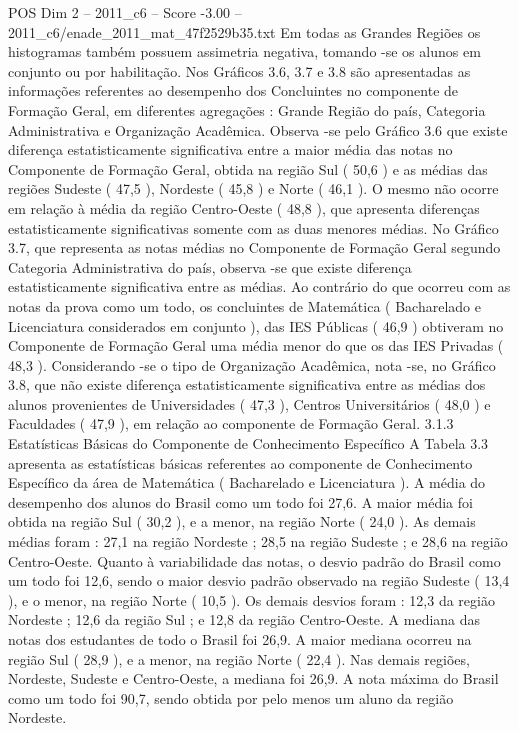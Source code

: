\begin{textsample}{POS Dim 2 – 2011\_c6 – Score -3.00 – 2011\_c6/enade\_2011\_mat\_47f2529b35.txt}
Em todas as Grandes Regiões os histogramas também possuem assimetria negativa, tomando -se os alunos em conjunto ou por habilitação.
Nos Gráficos 3.6, 3.7 e 3.8 são apresentadas as informações referentes ao desempenho dos Concluintes no componente de Formação Geral, em diferentes agregações : Grande Região do país, Categoria Administrativa e Organização Acadêmica.
Observa -se pelo Gráfico 3.6 que existe diferença estatisticamente significativa entre a maior média das notas no Componente de Formação Geral, obtida na região Sul ( 50,6 ) e as médias das regiões Sudeste ( 47,5 ), Nordeste ( 45,8 ) e Norte ( 46,1 ).
O mesmo não ocorre em relação à média da região Centro-Oeste ( 48,8 ), que apresenta diferenças estatisticamente significativas somente com as duas menores médias.
No Gráfico 3.7, que representa as notas médias no Componente de Formação Geral segundo Categoria Administrativa do país, observa -se que existe diferença estatisticamente significativa entre as médias.
Ao contrário do que ocorreu com as notas da prova como um todo, os concluintes de Matemática ( Bacharelado e Licenciatura considerados em conjunto ), das IES Públicas ( 46,9 ) obtiveram no Componente de Formação Geral uma média menor do que os das IES Privadas ( 48,3 ).
Considerando -se o tipo de Organização Acadêmica, nota -se, no Gráfico 3.8, que não existe diferença estatisticamente significativa entre as médias dos alunos provenientes de Universidades ( 47,3 ), Centros Universitários ( 48,0 ) e Faculdades ( 47,9 ), em relação ao componente de Formação Geral. 3.1.3 Estatísticas Básicas do Componente de Conhecimento Específico A Tabela 3.3 apresenta as estatísticas básicas referentes ao componente de Conhecimento Específico da área de Matemática ( Bacharelado e Licenciatura ).
A média do desempenho dos alunos do Brasil como um todo foi 27,6.
A maior média foi obtida na região Sul ( 30,2 ), e a menor, na região Norte ( 24,0 ).
As demais médias foram : 27,1 na região Nordeste ; 28,5 na região Sudeste ; e 28,6 na região Centro-Oeste.
Quanto à variabilidade das notas, o desvio padrão do Brasil como um todo foi 12,6, sendo o maior desvio padrão observado na região Sudeste ( 13,4 ), e o menor, na região Norte ( 10,5 ).
Os demais desvios foram : 12,3 da região Nordeste ; 12,6 da região Sul ; e 12,8 da região Centro-Oeste.
A mediana das notas dos estudantes de todo o Brasil foi 26,9.
A maior mediana ocorreu na região Sul ( 28,9 ), e a menor, na região Norte ( 22,4 ).
Nas demais regiões, Nordeste, Sudeste e Centro-Oeste, a mediana foi 26,9.
A nota máxima do Brasil como um todo foi 90,7, sendo obtida por pelo menos um aluno da região Nordeste.

\end{textsample}
